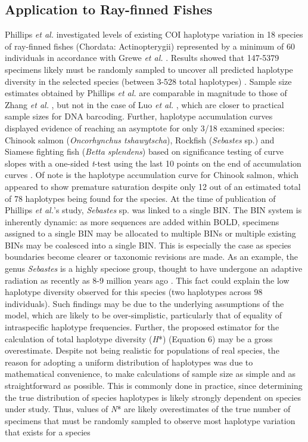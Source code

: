 \subsection{Application to Ray-finned Fishes}

Phillips \textit{et al.} \cite{phillips2015exploration} investigated levels of existing COI haplotype variation in 18 species of ray-finned fishes (Chordata: Actinopterygii) represented by a minimum of 60 individuals in accordance with Grewe \textit{et al.} \cite{grewe1993mitochondrial}. Results showed that 147-5379 specimens likely must be randomly sampled to uncover all predicted haplotype diversity in the selected species (between 3-528 total haplotypes) \cite{phillips2015exploration}. Sample size estimates obtained by Phillips \textit{et al.} \cite{phillips2015exploration} are comparable in magnitude to those of Zhang \textit{et al.} \cite{zhang2010estimating}, but not in the case of Luo \textit{et al.} \cite{luo2015simulation}, which are closer to practical sample sizes for DNA barcoding. Further, haplotype accumulation curves displayed evidence of reaching an asymptote for only 3/18 examined species: Chinook salmon (\textit{Oncorhynchus tshawytscha}), Rockfish (\textit{Sebastes} sp.) and Siamese fighting fish (\textit{Betta splendens}) based on significance testing of curve slopes with a one-sided \textit{t}-test using the last 10 points on the end of accumulation curves \cite{phillips2015exploration}. Of note is the haplotype accumulation curve for Chinook salmon, which appeared to show premature saturation despite only 12 out of an estimated total of 78 haplotypes being found for the species. At the time of publication of Phillips \textit{et al.}'s \cite{phillips2015exploration} study, \textit{Sebastes} sp. was linked to a single BIN. The BIN system is inherently dynamic: as more sequences are added within BOLD, specimens assigned to a single BIN may be allocated to multiple BINs or multiple existing BINs may be coalesced into a single BIN. This is especially the case as species boundaries become clearer or taxonomic revisions are made. As an example, the genus \textit{Sebastes} is a highly speciose group, thought to have undergone an adaptive radiation as recently as 8-9 million years ago \cite{steinke2009dna}. This fact could explain the low haplotype diversity observed for this species (two haplotypes across 98 individuals). Such findings may be due to the underlying assumptions of the model, which are likely to be over-simplistic, particularly that of equality of intraspecific haplotype frequencies. Further, the proposed estimator for the calculation of total haplotype diversity (\textit{H}*) (Equation 6) may be a gross overestimate. Despite not being realistic for populations of real species, the reason for adopting a uniform distribution of haplotypes was due to mathematical convenience, to make calculations of sample size as simple and as straightforward as possible. This is commonly done in practice, since determining the true distribution of species haplotypes is likely strongly dependent on species under study. Thus, values of \textit{N}* are likely overestimates of the true number of specimens that must be randomly sampled to observe most haplotype variation that exists for a species 
